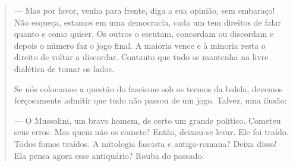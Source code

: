 \begin{quote}
--- Mas por favor, venha para frente, diga a sua opinião, sem embaraço!
Não esqueça, estamos em uma democracia, cada um tem direitos de falar
quanto e como quiser. Os outros o escutam, concordam ou discordam e
depois o número faz o jogo final. A maioria vence e à minoria resta o
direito de voltar a discordar. Contanto que tudo se mantenha na livre
dialética de tomar os lados.

Se nós colocamos a questão do fascismo sob os termos da balela, devemos
forçosamente admitir que tudo não passou de um jogo. Talvez, uma ilusão:

--- O Mussolini, um bravo homem, de certo um grande político. Cometeu
seus erros. Mas quem não os comete? Então, deixou-se levar. Ele foi
traído. Todos fomos traídos. A mitologia fascista e antigo-romana? Deixa
disso! Ela pensa agora esse antiquário? Rouba do passado.


\end{quote}
